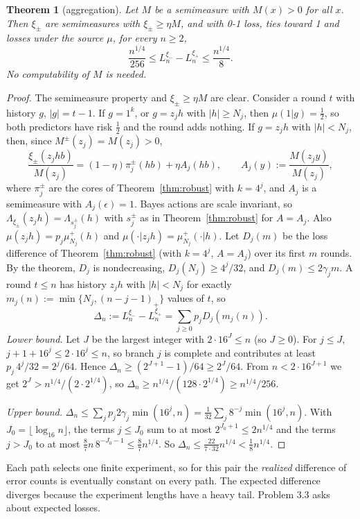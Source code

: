 \documentclass[11pt]{article}
\newcommand{\eps}{\epsilon}
\newtheorem{theorem}{Theorem}[section]
\theoremstyle{definition}
\theoremstyle{remark}
\begin{document}
\begin{theorem}[aggregation]\label{thm:aggregate}
Let $M$ be a semimeasure with $M(x)>0$ for all $x$. Then $\xi_\pm$ are
semimeasures with $\xi_\pm\ge\eta M$, and with 0-1 loss, ties toward 1 and
losses under the source $\mu$, for every $n\ge2$,
\[
\frac{n^{1/4}}{256}\le L_n^{\xi_-}-L_n^{\xi_+}\le\frac{n^{1/4}}8 .
\]
No computability of $M$ is needed.
\end{theorem}

\begin{proof}
The semimeasure property and $\xi_\pm\ge\eta M$ are clear. Consider a round $t$
with history $g$, $|g|=t-1$.
If $g=1^k$, or $g=z_jh$ with $|h|\ge N_j$, then $\mu(1|g)=\frac12$, so both
predictors have risk $\frac12$ and the round adds nothing.
If $g=z_jh$ with $|h|<N_j$, then, since $M^\pm(z_j)=M(z_j)>0$,
\[
\frac{\xi_\pm(z_jhb)}{M(z_j)}=(1-\eta)\pi^\pm_j(hb)+\eta A_j(hb),\qquad
A_j(y):=\frac{M(z_jy)}{M(z_j)},
\]
where $\pi^\pm_j$ are the cores of Theorem~\ref{thm:robust} with $k=4^j$, and
$A_j$ is a semimeasure with $A_j(\eps)=1$. Bayes actions are scale invariant,
so $\Lambda_{\xi_\pm}(z_jh)=\Lambda_{s^\pm_j}(h)$ with $s^\pm_j$ as in
Theorem~\ref{thm:robust} for $A=A_j$. Also $\mu(z_jh)=p_j\mu^+_{N_j}(h)$ and
$\mu(\cdot|z_jh)=\mu^+_{N_j}(\cdot|h)$. Let $D_j(m)$ be the loss difference of
Theorem~\ref{thm:robust} (with $k=4^j$, $A=A_j$) over its first $m$ rounds.
By the theorem, $D_j$ is nondecreasing, $D_j(N_j)\ge4^j/32$, and
$D_j(m)\le2\gamma_jm$. A round $t\le n$ has history $z_jh$ with $|h|<N_j$ for
exactly ${m_j(n):=\min\{N_j,(n-j-1)_+\}}$ values of $t$, so
\[
\Delta_n:=L_n^{\xi_-}-L_n^{\xi_+}=\sum_{j\ge0}p_jD_j(m_j(n)).
\]
\emph{Lower bound.} Let $J$ be the largest integer with $2\cdot16^J\le n$
(so $J\ge0$). For $j\le J$, $j+1+16^j\le2\cdot16^j\le n$, so branch $j$ is
complete and contributes at least $p_j\,4^j/32=2^j/64$. Hence
$\Delta_n\ge(2^{J+1}-1)/64\ge2^J/64$. From $n<2\cdot16^{J+1}$ we get
$2^J>n^{1/4}/(2\cdot2^{1/4})$, so $\Delta_n\ge n^{1/4}/(128\cdot2^{1/4})\ge n^{1/4}/256$.

\emph{Upper bound.}
$\Delta_n\le\sum_jp_j2\gamma_j\min(16^j,n)=\frac1{32}\sum_j8^{-j}\min(16^j,n)$.
With $J_0=\lfloor\log_{16}n\rfloor$, the terms $j\le J_0$ sum to at most
$2^{J_0+1}\le2n^{1/4}$ and the terms $j>J_0$ to at most
$\frac87n\,8^{-J_0-1}\le\frac87n^{1/4}$. So
$\Delta_n\le\frac{22}{7\cdot32}n^{1/4}<\frac18n^{1/4}$.
\end{proof}

Each path selects one finite experiment, so for this pair the
\emph{realized} difference of error counts is eventually constant on every
path. The expected difference diverges because the experiment lengths have a
heavy tail. Problem 3.3 asks about expected losses.
\end{document}
